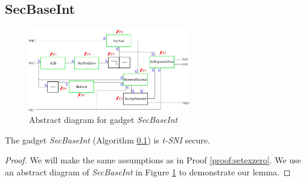 \documentclass[runningheads]{llncs}
\begin{document}
\subsection{SecBaseInt}
\label{alg:secbaseint}
\begin{figure}[!ht]
    \includegraphics[width=7cm]{figure/secbaseint.pdf}
    \caption{Abstract diagram for gadget \emph{SecBaseInt}}
    \label{fig:secbaseint}
\end{figure}
\begin{lemma}\label{lem:secbaseint}
    The gadget \emph{SecBaseInt} (Algorithm \ref{alg:secbaseint}) is \emph{t-SNI} secure.    
\end{lemma}
\begin{proof}
    We will make the same assumptions as in Proof \ref{proof:setexzero}. We use an abstract diagram of \emph{SecBaseInt} in Figure \ref{fig:secbaseint} to demonstrate our lemma.
\end{proof}
%
%
%
 
 
\end{document}
